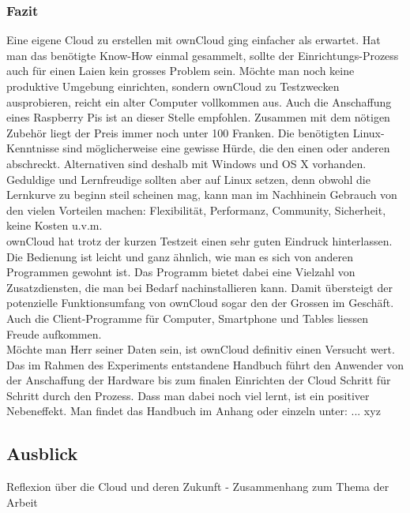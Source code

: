 \subsubsection{Fazit}
Eine eigene Cloud zu erstellen mit ownCloud ging einfacher als erwartet. Hat man das benötigte Know-How einmal gesammelt, sollte der Einrichtungs-Prozess auch für einen Laien kein grosses Problem sein. Möchte man noch keine produktive Umgebung einrichten, sondern ownCloud zu Testzwecken ausprobieren, reicht ein alter Computer vollkommen aus. Auch die Anschaffung eines Raspberry Pis ist an dieser Stelle empfohlen. Zusammen mit dem nötigen Zubehör liegt der Preis immer noch unter 100 Franken. Die benötigten Linux-Kenntnisse sind möglicherweise eine gewisse Hürde, die den einen oder anderen abschreckt. Alternativen sind deshalb mit Windows und OS X vorhanden. Geduldige und Lernfreudige sollten aber auf Linux setzen, denn obwohl die Lernkurve zu beginn steil scheinen mag, kann man im Nachhinein Gebrauch von den vielen Vorteilen machen: Flexibilität, Performanz, Community, Sicherheit, keine Kosten u.v.m.
\\
ownCloud hat trotz der kurzen Testzeit einen sehr guten Eindruck hinterlassen. Die Bedienung ist leicht und ganz ähnlich, wie man es sich von anderen Programmen gewohnt ist. Das Programm bietet dabei eine Vielzahl von Zusatzdiensten, die man bei Bedarf nachinstallieren kann. Damit übersteigt der potenzielle Funktionsumfang von ownCloud sogar den der Grossen im Geschäft. Auch die Client-Programme für Computer, Smartphone und Tables liessen Freude aufkommen. 
\\
Möchte man Herr seiner Daten sein, ist ownCloud definitiv einen Versucht wert. Das im Rahmen des Experiments entstandene Handbuch führt den Anwender von der Anschaffung der Hardware bis zum finalen Einrichten der Cloud Schritt für Schritt durch den Prozess. Dass man dabei noch viel lernt, ist ein positiver Nebeneffekt.
Man findet das Handbuch im Anhang oder einzeln unter: ... xyz


\subsection{Ausblick}
Reflexion über die Cloud und deren Zukunft - Zusammenhang zum Thema der Arbeit
